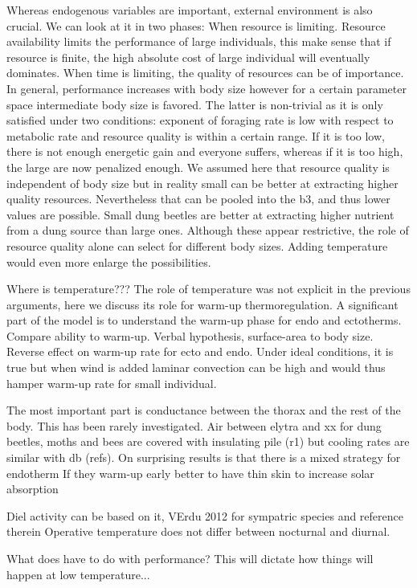Whereas endogenous variables are important, external environment is also crucial.
We can look at it in two phases:
When resource is limiting.
Resource availability limits the performance of large individuals, this make sense that if resource is finite, the high absolute cost of large individual will eventually dominates.
When time is limiting, the quality of resources can be of importance.
In general, performance increases with body size however for a certain parameter space intermediate body size is favored.
The latter is non-trivial as it is only satisfied under two conditions: exponent of foraging rate is low with respect to metabolic rate and resource quality is within a certain range.
If it is too low, there is not enough energetic gain and everyone suffers, whereas if it is too high, the large are now penalized enough.
We assumed here that resource quality is  independent of body size but in reality small can be better at extracting higher quality resources.
Nevertheless that can be pooled into the b3, and thus lower values are possible.
Small dung beetles are better at extracting higher nutrient from a dung source than large ones.
Although these appear restrictive, the role of resource quality alone can select for different body sizes.
Adding temperature would even more enlarge the possibilities.

Where is temperature???
The role of temperature was not explicit in the previous arguments, here we discuss its role for warm-up thermoregulation.
A significant part of the model is to understand the warm-up phase for endo and ectotherms. 
Compare ability to warm-up.
Verbal hypothesis, surface-area to body size. 
Reverse effect on warm-up rate for ecto and endo.
Under ideal conditions, it is true but when wind is added laminar convection can be high and would thus hamper warm-up rate for small individual. 

The most important part is conductance between the thorax and the rest of the body. 
This has been rarely investigated.
Air between elytra and xx for dung beetles, moths and bees are covered with insulating pile (r1) but cooling rates are similar with db (refs).
On surprising results is that there is a mixed strategy for endotherm
If they warm-up early better to have thin skin to increase solar absorption

Diel activity can be based on it, VErdu 2012 for sympatric species and reference therein
Operative temperature does not differ between nocturnal and diurnal.

What does have to do with performance?
This will dictate how things will happen at low temperature...

